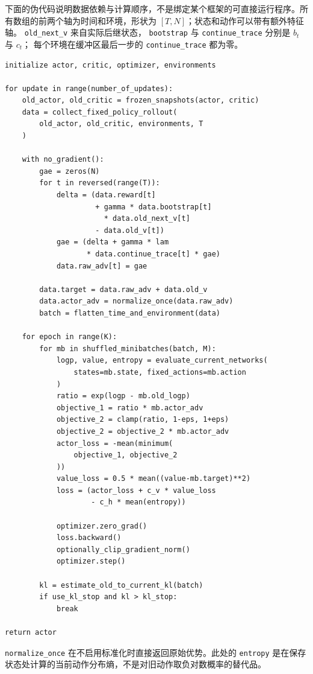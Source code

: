 \documentclass[UTF8]{ctexart}
\begin{document}
下面的伪代码说明数据依赖与计算顺序，不是绑定某个框架的可直接运行程序。所有数组的前两个轴为时间和环境，形状为 $[T,N]$；状态和动作可以带有额外特征轴。
\texttt{old\_next\_v} 来自实际后继状态，
\texttt{bootstrap} 与 \texttt{continue\_trace} 分别是 $b_t$ 与 $c_t$；
每个环境在缓冲区最后一步的 \texttt{continue\_trace} 都为零。

\begin{verbatim}
initialize actor, critic, optimizer, environments

for update in range(number_of_updates):
    old_actor, old_critic = frozen_snapshots(actor, critic)
    data = collect_fixed_policy_rollout(
        old_actor, old_critic, environments, T
    )

    with no_gradient():
        gae = zeros(N)
        for t in reversed(range(T)):
            delta = (data.reward[t]
                     + gamma * data.bootstrap[t]
                       * data.old_next_v[t]
                     - data.old_v[t])
            gae = (delta + gamma * lam
                   * data.continue_trace[t] * gae)
            data.raw_adv[t] = gae

        data.target = data.raw_adv + data.old_v
        data.actor_adv = normalize_once(data.raw_adv)
        batch = flatten_time_and_environment(data)

    for epoch in range(K):
        for mb in shuffled_minibatches(batch, M):
            logp, value, entropy = evaluate_current_networks(
                states=mb.state, fixed_actions=mb.action
            )
            ratio = exp(logp - mb.old_logp)
            objective_1 = ratio * mb.actor_adv
            objective_2 = clamp(ratio, 1-eps, 1+eps)
            objective_2 = objective_2 * mb.actor_adv
            actor_loss = -mean(minimum(
                objective_1, objective_2
            ))
            value_loss = 0.5 * mean((value-mb.target)**2)
            loss = (actor_loss + c_v * value_loss
                    - c_h * mean(entropy))

            optimizer.zero_grad()
            loss.backward()
            optionally_clip_gradient_norm()
            optimizer.step()

        kl = estimate_old_to_current_kl(batch)
        if use_kl_stop and kl > kl_stop:
            break

return actor
\end{verbatim}

\texttt{normalize\_once} 在不启用标准化时直接返回原始优势。此处的
\texttt{entropy} 是在保存状态处计算的当前动作分布熵，不是对旧动作取负对数概率的替代品。
\end{document}
